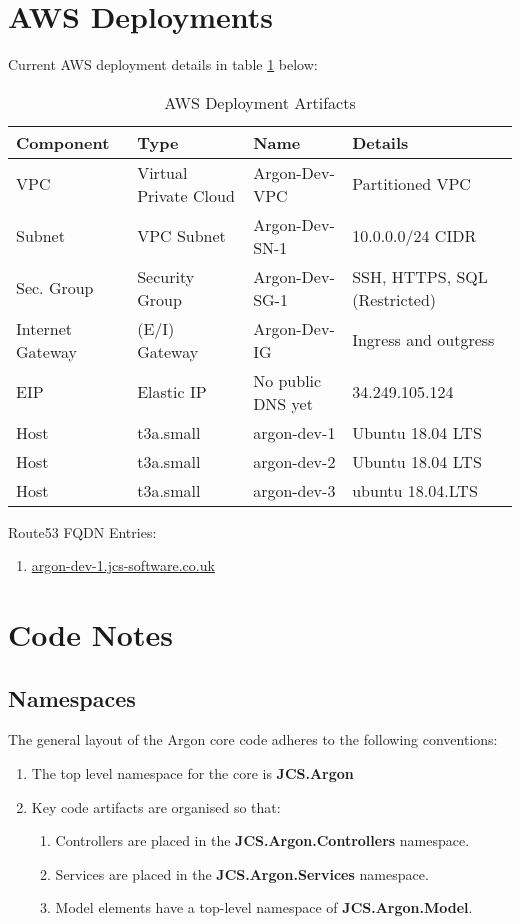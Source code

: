 \documentclass{book}
\begin{document}
\section{AWS Deployments}
Current AWS deployment details in table \ref{table:2} below:
\begin{table}[h!]
    \centering
    \begin{tabular}{|| l | l | l | l ||}
        \hline 
        \textbf{Component} & \textbf{Type} & \textbf{Name} & \textbf{Details} \\
        \hline
        VPC & Virtual Private Cloud & Argon-Dev-VPC & Partitioned VPC \\
        Subnet & VPC Subnet & Argon-Dev-SN-1 & 10.0.0.0/24 CIDR \\
        Sec. Group & Security Group & Argon-Dev-SG-1 & SSH, HTTPS, SQL (Restricted) \\
        Internet Gateway & (E/I) Gateway & Argon-Dev-IG & Ingress and outgress \\
        EIP & Elastic IP & No public DNS yet & 34.249.105.124 \\
        Host & t3a.small & argon-dev-1 & Ubuntu 18.04 LTS \\
        Host & t3a.small & argon-dev-2 & Ubuntu 18.04 LTS \\
        Host & t3a.small & argon-dev-3 & ubuntu 18.04.LTS \\
        \hline
    \end{tabular}
    \caption{AWS Deployment Artifacts}
    \label{table:2}
\end{table}   
Route53 FQDN Entries:
\begin{enumerate}
    \item \url{argon-dev-1.jcs-software.co.uk}
\end{enumerate}
\section{Code Notes}
\subsection{Namespaces}
The general layout of the Argon core code adheres to the following conventions:
\begin{enumerate}
    \item The top level namespace for the core is \textbf{JCS.Argon}
    \item Key code artifacts are organised so that:
    \begin{enumerate}
        \item Controllers are placed in the \textbf{JCS.Argon.Controllers} namespace.
        \item Services are placed in the \textbf{JCS.Argon.Services} namespace.
        \item Model elements have a top-level namespace of \textbf{JCS.Argon.Model}.
    \end{enumerate}
\end{enumerate}
\end{document}
